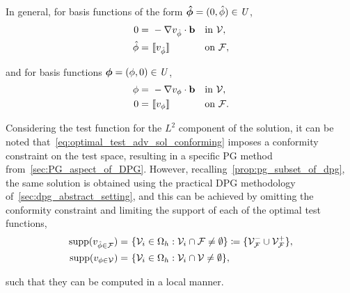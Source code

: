 In general, for basis functions of the form $\mathit{\bm{{\hat{\phi}}}} = (0,\hat{\phi}) \in \mathit{{{U}}}$,
\begin{align}
0 =\ & -\nabla v_{\hat{\phi}} \cdot \vect{b} && \text{in}\ \fe{V}, \label{eq:optimal_test_adv_trace_0} \\
\hat{\phi} =\ & \jump{v_{\hat{\phi}}} && \text{on}\ \fe{F},
\label{eq:optimal_test_adv_trace_1}
\end{align}

and for basis functions $\mathit{\bm{{\phi}}} = (\phi,0) \in \mathit{{{U}}}$,
\begin{align}
\phi =\ & -\nabla v_{\phi} \cdot \vect{b} && \text{in}\ \fe{V}, \label{eq:optimal_test_adv_sol} \\
0 =\ & \jump{v_{\phi}} && \text{on}\ \fe{F}.
\label{eq:optimal_test_adv_sol_conforming}
\end{align}

Considering the test function for the $L^2$ component of the solution, it can be noted
that~\eqref{eq:optimal_test_adv_sol_conforming} imposes a conformity constraint on the test space, resulting in a
specific PG method from~\autoref{sec:PG_aspect_of_DPG}. However, recalling~\autoref{prop:pg_subset_of_dpg}, the same
solution is obtained using the practical DPG methodology of~\autoref{sec:dpg_abstract_setting}, and this can be achieved
by omitting the conformity constraint and limiting the support of each of the optimal test functions,
\begin{align}
{\text{supp}(v_{\hat{\phi} \in \mathcal{{{F}}}})}
=\ & \{ \mathcal{{{V}}}_i \in \Omega_h : \mathcal{{{V}}}_i \cap \mathcal{{{F}}} \ne \emptyset \}
\coloneqq \{ \mathcal{{{V}}}_{\mathcal{{{F}}}}^- \cup \mathcal{{{V}}}_{\mathcal{{{F}}}}^+ \}, \\
{\text{supp}(v_{\phi \in \mathcal{{{V}}}})} =\ & \{ \mathcal{{{V}}}_i \in \Omega_h : \mathcal{{{V}}}_i \cap \mathcal{{{V}}} \ne \emptyset \},
\end{align}

such that they can be computed in a local manner.

